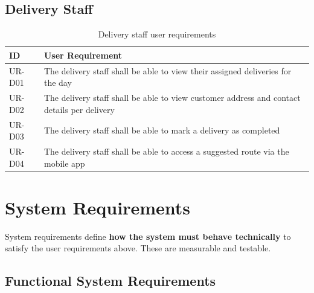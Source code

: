 \documentclass[12pt, a4paper]{report}
\begin{document}
\subsection{Delivery Staff}

\begin{table}[H]
  \centering
  \begin{tabularx}{\textwidth}{L{1.5cm} X}
    \toprule
    \textbf{ID} & \textbf{User Requirement} \\
    \midrule
    UR-D01 & The delivery staff shall be able to view their assigned deliveries for the day \\
    UR-D02 & The delivery staff shall be able to view customer address and contact details per delivery \\
    UR-D03 & The delivery staff shall be able to mark a delivery as completed \\
    UR-D04 & The delivery staff shall be able to access a suggested route via the mobile app \\
    \bottomrule
  \end{tabularx}
  \caption{Delivery staff user requirements}
\end{table}

\section{System Requirements}

System requirements define \textbf{how the system must behave technically} to
satisfy the user requirements above. These are measurable and testable.

\subsection{Functional System Requirements}
\end{document}
